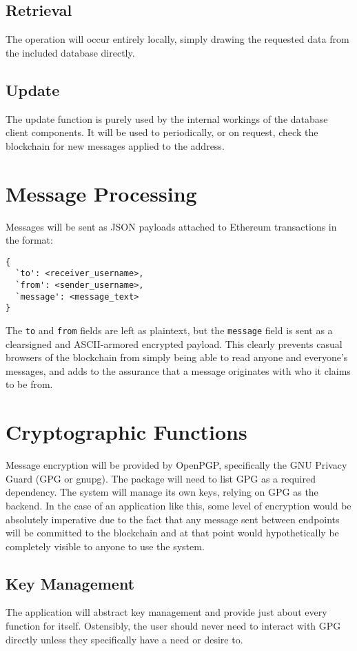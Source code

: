 \documentclass[]{article}
\begin{document}
\subsection{Retrieval}
The operation will occur entirely locally, simply drawing the requested data from the included database directly.
\subsection{Update}
The update function is purely used by the internal workings of the database client components. It will be used to periodically, or on request, check the blockchain for new messages applied to the address.

\section{Message Processing}
Messages will be sent as JSON payloads attached to Ethereum transactions in the format:
\begin{verbatim}
{
  `to': <receiver_username>,
  `from': <sender_username>,
  `message': <message_text>
}
\end{verbatim}
The \verb!to! and \verb!from! fields are left as plaintext, but the \verb!message! field is sent as a clearsigned and ASCII-armored encrypted payload. This clearly prevents casual browsers of the blockchain from simply being able to read anyone and everyone's messages, and adds to the assurance that a message originates with who it claims to be from.

\section{Cryptographic Functions}
Message encryption will be provided by OpenPGP, specifically the GNU Privacy Guard (GPG or gnupg). The package will need to list GPG as a required dependency. The system will manage its own keys, relying on GPG as the backend. In the case of an application like this, some level of encryption would be absolutely imperative due to the fact that any message sent between endpoints will be committed to the blockchain and at that point would hypothetically be completely visible to anyone to use the system.
\subsection{Key Management}
The application will abstract key management and provide just about every function for itself. Ostensibly, the user should never need to interact with GPG directly unless they specifically have a need or desire to.
\end{document}
